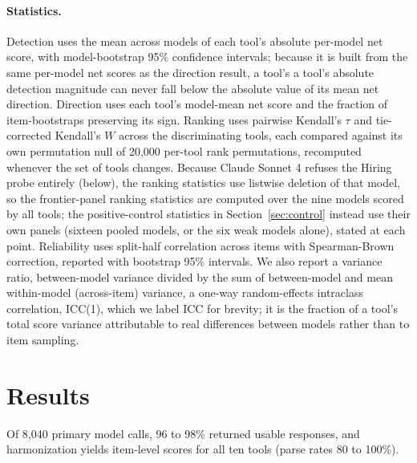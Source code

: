 \documentclass[11pt]{article}
\begin{document}
\paragraph{Statistics.} Detection uses the mean across models of each tool's absolute per-model net score, with model-bootstrap 95\% confidence intervals; because it is built from the same per-model net scores as the direction result, a tool's a tool's absolute detection magnitude can never fall below the absolute value of its mean net direction. Direction uses each tool's model-mean net score and the fraction of item-bootstraps preserving its sign. Ranking uses pairwise Kendall's $\tau$ and tie-corrected Kendall's $W$ across the discriminating tools, each compared against its own permutation null of 20{,}000 per-tool rank permutations, recomputed whenever the set of tools changes. Because Claude Sonnet 4 refuses the Hiring probe entirely (below), the ranking statistics use listwise deletion of that model, so the frontier-panel ranking statistics are computed over the nine models scored by all tools; the positive-control statistics in Section~\ref{sec:control} instead use their own panels (sixteen pooled models, or the six weak models alone), stated at each point. Reliability uses split-half correlation across items with Spearman-Brown correction, reported with bootstrap 95\% intervals. We also report a variance ratio, between-model variance divided by the sum of between-model and mean within-model (across-item) variance, a one-way random-effects intraclass correlation, ICC(1), which we label ICC for brevity; it is the fraction of a tool's total score variance attributable to real differences between models rather than to item sampling.

\section{Results}
Of 8{,}040 primary model calls, 96 to 98\% returned usable responses, and harmonization yields item-level scores for all ten tools (parse rates 80 to 100\%).
\end{document}
